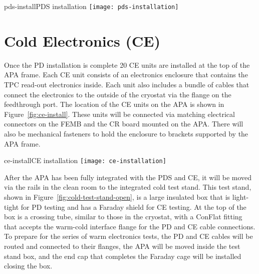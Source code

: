 \begin{cdrfigure}{pds-install}{PDS installation}
\texttt{[image: pds-installation]}
\end{cdrfigure}

\section{Cold Electronics (CE)}
\label{subsec:ce_install}

Once the PD installation is complete 20 CE units are installed at the top of the APA frame.  Each CE unit consists of an electronics enclosure that contains the TPC read-out electronics inside.  Each unit also includes a bundle of cables that connect the electronics to the outside of the cryostat via the flange on the feedthrough port.  %
The location of the CE units on the APA is shown in Figure~\ref{fig:ce-install}.  These units will be connected via matching electrical connectors on the FEMB and the CR board mounted on the APA.  There will also be mechanical fasteners to hold the enclosure to brackets supported by the APA frame.  %

\begin{cdrfigure}[CE installation]{ce-install}{CE installation}
\texttt{[image: ce-installation]}
\end{cdrfigure}

After the APA has been fully integrated with the PDS and CE, it will be moved via the rails in the clean room to the integrated cold test stand.  This test stand, shown in Figure~\ref{fig:cold-test-stand-open}, is a large insulated box that is light-tight for PD testing and has a Faraday shield for CE testing.  At the top of the box is a crossing tube, similar to those in the cryostat, with a ConFlat fitting that accepts the warm-cold interface flange for the PD and CE cable connections.  To prepare for the series of warm electronics tests, the PD and CE cables will be routed and connected to their flanges, the APA will be moved inside the test stand box, and the end cap that completes the Faraday cage will be installed closing the box.  %

